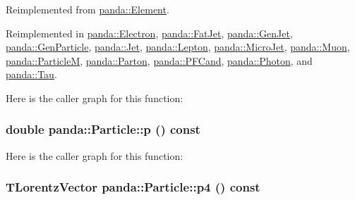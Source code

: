 Reimplemented from \hyperlink{classpanda_1_1Element_aab6953bcc5df661a05d49fca81a0a4fc}{panda::Element}.

Reimplemented in \hyperlink{classpanda_1_1Electron_adf667b212f1ea11094dd276fd913c4f6}{panda::Electron}, \hyperlink{classpanda_1_1FatJet_a20e4f6ca23c2a9a603c33e7f023337fe}{panda::FatJet}, \hyperlink{classpanda_1_1GenJet_aeaa1c9ce79a2ac5e7d49ff5ea1e34136}{panda::GenJet}, \hyperlink{classpanda_1_1GenParticle_a46eed568bb72468ccda95c09002ea6a5}{panda::GenParticle}, \hyperlink{classpanda_1_1Jet_a06509e069beffe7d5fa12a5450254e6a}{panda::Jet}, \hyperlink{classpanda_1_1Lepton_a24b1cd552930db2af2734d3acbb27257}{panda::Lepton}, \hyperlink{classpanda_1_1MicroJet_a9375dd6d13362ae323e9915b529458e8}{panda::MicroJet}, \hyperlink{classpanda_1_1Muon_a2f91424e93572f9efd189884d95efaf6}{panda::Muon}, \hyperlink{classpanda_1_1ParticleM_a37f7be4e1150b6080b47b005af730af5}{panda::ParticleM}, \hyperlink{classpanda_1_1Parton_a0def202110cf69ff7d9213cbf9db02ec}{panda::Parton}, \hyperlink{classpanda_1_1PFCand_ad32d7ae95ef68eb076604648684aca06}{panda::PFCand}, \hyperlink{classpanda_1_1Photon_aa747baa897eca18a06d897063402a966}{panda::Photon}, and \hyperlink{classpanda_1_1Tau_a1482f04be4fffde6b5c648ae3e7b539f}{panda::Tau}.

Here is the caller graph for this function:\hypertarget{classpanda_1_1Particle_a581eab76794352c5908ef3e8e6d36a95}{
\subsubsection[{p}]{\setlength{\rightskip}{0pt plus 5cm}double panda::Particle::p () const}}
\label{classpanda_1_1Particle_a581eab76794352c5908ef3e8e6d36a95}


Here is the caller graph for this function:\hypertarget{classpanda_1_1Particle_aab2f22a57738ea3b2d3226e72c150a99}{
\subsubsection[{p4}]{\setlength{\rightskip}{0pt plus 5cm}TLorentzVector panda::Particle::p4 () const}}
\label{classpanda_1_1Particle_aab2f22a57738ea3b2d3226e72c150a99}


